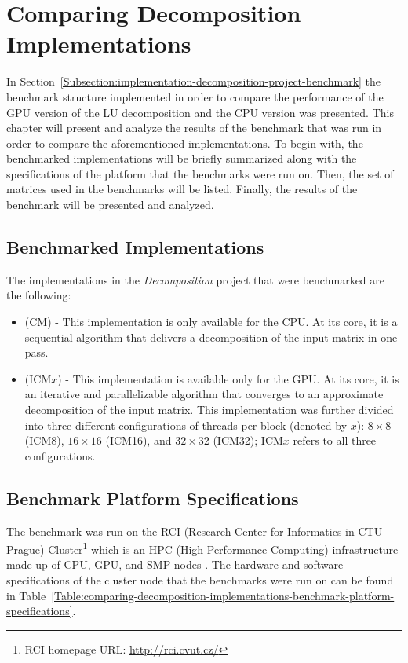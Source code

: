 \chapter{Comparing Decomposition Implementations}\label{Chapter:comparing-decomposition-implementations}
In Section~\ref{Subsection:implementation-decomposition-project-benchmark} the benchmark structure implemented in order to compare the performance of the GPU version of the LU decomposition and the CPU version was presented. This chapter will present and analyze the results of the benchmark that was run in order to compare the aforementioned implementations. To begin with, the benchmarked implementations will be briefly summarized along with the specifications of the platform that the benchmarks were run on. Then, the set of matrices used in the benchmarks will be listed. Finally, the results of the benchmark will be presented and analyzed.

\section{Benchmarked Implementations}\label{Section:comparing-decomposition-implementations-benchmarked-implementations}
The implementations in the \textit{Decomposition} project that were benchmarked are the following:

\begin{itemize}
	\item \textit{} (CM) - This implementation is only available for the CPU. At its core, it is a sequential algorithm that delivers a decomposition of the input matrix in one pass.
	\item \textit{} (ICM$ x $) - This implementation is available only for the GPU. At its core, it is an iterative and parallelizable algorithm that converges to an approximate decomposition of the input matrix. This implementation was further divided into three different configurations of threads per block (denoted by $ x $): $ 8\times 8 $ (ICM8), $ 16\times 16 $ (ICM16), and $ 32\times 32 $ (ICM32); ICM$ x $ refers to all three configurations.
\end{itemize}



\section{Benchmark Platform Specifications}\label{Section:comparing-decomposition-implementations-benchmark-platform-specifications}
The benchmark was run on the RCI (Research Center for Informatics in CTU Prague) Cluster\footnote{RCI homepage URL: \url{http://rci.cvut.cz/}} which is an HPC (High-Performance Computing) infrastructure made up of CPU, GPU, and SMP nodes \cite{VVJW5lCpZRWyg8xc}. The hardware and software specifications of the cluster node that the benchmarks were run on can be found in Table~\ref{Table:comparing-decomposition-implementations-benchmark-platform-specifications}.

